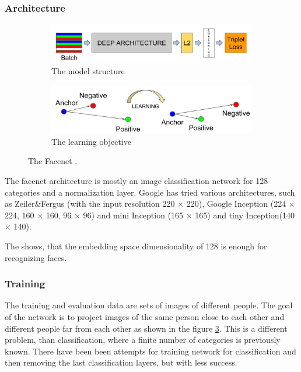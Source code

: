 \documentclass[a4paper,12pt,titlepage]{article}
\numberwithin{figure}{section}
\begin{document}
\subsubsection{Architecture}
\begin{figure}
    \begin{subfigure}[Sample1]{0.5\linewidth}
    	\includegraphics[width=0.95\linewidth]{fig/facenet.png} 
        \caption{The model structure}
        \label{fig:facenet_structure}
    \end{subfigure}
    \quad
    \begin{subfigure}[Sample1]{0.5\linewidth} 
    	\includegraphics[width=0.95\linewidth]{fig/triplet_loss.png}
        \caption{The learning objective}   
        \label{fig:triplet_loss}
    \end{subfigure}
    \caption{The Facenet \cite{schroff2015facenet}.}
\end{figure}

The facenet architecture is mostly an image classification network for 128 categories and a normalization layer. Google has tried various architectures, such as Zeiler\&Fergus \cite{zeiler2014visualizing} (with the input resolution 220 $\times$ 220), Google Inception \cite{szegedy2016rethinking} (224 $\times$ 224, 160 $\times$ 160, 96 $\times$ 96) and mini Inception (165 $\times$ 165) and tiny Inception(140 $\times$ 140). 


The \cite{szegedy2016rethinking} shows, that the embedding space dimensionality of 128 is enough for recognizing faces.

\subsubsection{Training}
The training and evaluation data are sets of images of different people. The goal of the network is to project images of the same person close to each other and different people far from each other as shown in the figure \ref{fig:triplet_loss}. This is a different problem, than classification, where a finite number of categories is previously known. There have been been attempts \cite{wst2008deeply, taigman2014deepface} for training network for classification and then removing the last classification layers, but with less success.
\end{document}
